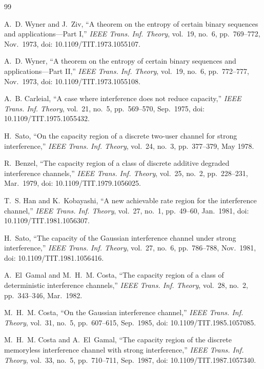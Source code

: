 \documentclass[12pt,draftclsnofoot,onecolumn,conference]{IEEEtran}
\begin{document}
\begin{thebibliography}{99}

A.~D. Wyner and J.~Ziv, ``A theorem on the entropy of certain binary
sequences and applications---Part I,'' \emph{IEEE Trans. Inf. Theory},
vol.~19, no.~6, pp.~769--772, Nov.~1973,
doi: 10.1109/TIT.1973.1055107.

A.~D. Wyner, ``A theorem on the entropy of certain binary sequences and
applications---Part II,'' \emph{IEEE Trans. Inf. Theory}, vol.~19, no.~6,
pp.~772--777, Nov.~1973, doi: 10.1109/TIT.1973.1055108.

A.~B. Carleial, ``A case where interference does not reduce capacity,''
\emph{IEEE Trans. Inf. Theory}, vol.~21, no.~5, pp.~569--570, Sep.~1975,
doi: 10.1109/TIT.1975.1055432.

H.~Sato, ``On the capacity region of a discrete two-user channel for strong
interference,'' \emph{IEEE Trans. Inf. Theory}, vol.~24, no.~3,
pp.~377--379, May 1978.

R.~Benzel, ``The capacity region of a class of discrete additive degraded
interference channels,'' \emph{IEEE Trans. Inf. Theory}, vol.~25, no.~2,
pp.~228--231, Mar.~1979, doi: 10.1109/TIT.1979.1056025.

T.~S. Han and K.~Kobayashi, ``A new achievable rate region for the
interference channel,'' \emph{IEEE Trans. Inf. Theory}, vol.~27, no.~1,
pp.~49--60, Jan.~1981, doi: 10.1109/TIT.1981.1056307.

H.~Sato, ``The capacity of the Gaussian interference channel under strong
interference,'' \emph{IEEE Trans. Inf. Theory}, vol.~27, no.~6,
pp.~786--788, Nov.~1981, doi: 10.1109/TIT.1981.1056416.

A.~El~Gamal and M.~H.~M. Costa, ``The capacity region of a class of
deterministic interference channels,'' \emph{IEEE Trans. Inf. Theory},
vol.~28, no.~2, pp.~343--346, Mar.~1982.

M.~H.~M. Costa, ``On the Gaussian interference channel,'' \emph{IEEE Trans.
Inf. Theory}, vol.~31, no.~5, pp.~607--615, Sep.~1985,
doi: 10.1109/TIT.1985.1057085.

M.~H.~M. Costa and A.~El~Gamal, ``The capacity region of the discrete
memoryless interference channel with strong interference,'' \emph{IEEE
Trans. Inf. Theory}, vol.~33, no.~5, pp.~710--711, Sep.~1987,
doi: 10.1109/TIT.1987.1057340.


\end{thebibliography}
\end{document}
